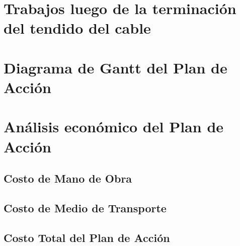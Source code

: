 \section{Trabajos luego de la terminación del tendido del cable}

\section{Diagrama de Gantt del Plan de Acción}

\section{Análisis económico del Plan de Acción}

\subsection{Costo de Mano de Obra}

\subsection{Costo de Medio de Transporte}

\subsection{Costo Total del Plan de Acción}